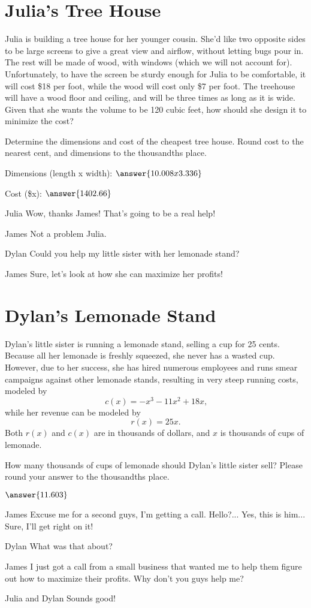 \documentclass{ximera}
\begin{document}
\section{Julia's Tree House}
Julia is building a tree house for her younger cousin. She'd like two opposite sides to be large screens to give a great view and airflow, without letting bugs pour in. The rest will be made of wood, with windows (which we will not account for). Unfortunately, to have the screen be sturdy enough for Julia to be comfortable, it will cost \$18 per foot, while the wood will cost only \$7 per foot. The treehouse will have a wood floor and ceiling, and will be three times as long as it is wide. Given that she wants the volume to be 120 cubic feet, how should she design it to minimize the cost?
\begin{question}
Determine the dimensions and cost of the cheapest tree house. Round cost to the nearest cent, and dimensions to the thousandths place.

Dimensions (length x width): $\answer{10.008 x 3.336}$

Cost (\$x): $\answer{1402.66}$

\end{question}
\begin{dialogue}
\item[Julia] Wow, thanks James! That's going to be a real help!
\item[James] Not a problem Julia.
\item[Dylan] Could you help my little sister with her lemonade stand?
\item[James] Sure, let's look at how she can maximize her profits!
\end{dialogue}

\section{Dylan's Lemonade Stand}
Dylan's little sister is running a lemonade stand, selling a cup for 25 cents. Because all her lemonade is freshly squeezed, she never has a wasted cup. However, due to her success, she has hired numerous employees and runs smear campaigns against other lemonade stands, resulting in very steep running costs, modeled by $$c(x) = -x^3-11x^2+18x\text{,}$$ while her revenue can be modeled by $$r(x) = 25x\text{.}$$ Both $r(x)$ and $c(x)$ are in thousands of dollars, and $x$ is thousands of cups of lemonade.
\begin{question}
How many thousands of cups of lemonade should Dylan's little sister sell? Please round your answer to the thousandths place.

$\answer{11.603}$
\end{question}
\begin{dialogue}
\item[James] Excuse me for a second guys, I'm getting a call. Hello?... Yes, this is him... Sure, I'll get right on it!
\item[Dylan] What was that about?
\item[James] I just got a call from a small business that wanted me to help them figure out how to maximize their profits. Why don't you guys help me?
\item[Julia and Dylan] Sounds good!
\end{dialogue}
\end{document}
